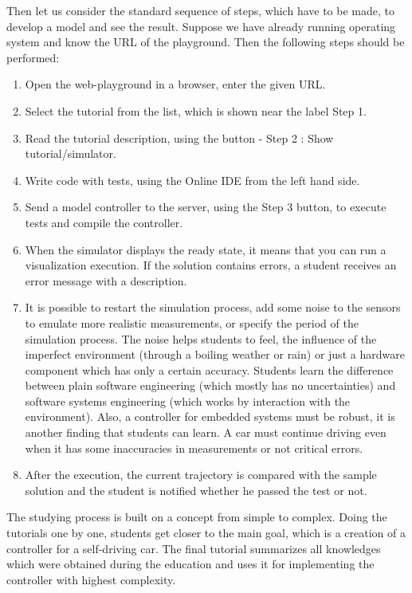 Then let us consider the standard sequence of steps, which have to be made, to develop a model and see the result. Suppose we have already running operating system and know the URL \cite{OnlineExample} of the playground. Then the following steps should be performed:
\begin{enumerate}
    \item Open the web-playground in a browser, enter the given URL.
    \item Select the tutorial from the list, which is shown near the label Step 1.
    \item Read the tutorial description, using the button - Step 2 : Show tutorial/simulator.
    \item Write code with tests, using the Online IDE from the left hand side.
    \item Send a model controller to the server, using the Step 3 button, to execute tests and compile the controller.
    \item When the simulator displays the ready state, it means that you can run a visualization execution. If the solution contains errors, a student receives an error message with a description.
    \item It is possible to restart the simulation process, add some noise to the sensors to emulate more realistic measurements, or specify the period of the simulation process. The noise helps students to feel, the influence of the imperfect environment (through a boiling weather or rain) or just a hardware component which has only a certain accuracy. Students learn the difference between plain software engineering (which mostly has no uncertainties) and software systems engineering (which works by interaction with the environment). Also, a controller for embedded systems must be robust, it is another finding that students can learn. A car must continue driving even when it has some inaccuracies in measurements or not critical errors.
    \item After the execution, the current trajectory is compared with the sample solution and the student is notified whether he passed the test or not.
\end{enumerate}
The studying process is built on a concept from simple to complex. Doing the tutorials one by one, students get closer to the main goal, which is a creation of a controller for a self-driving car. The final tutorial summarizes all knowledges which were obtained during the education and uses it for implementing the controller with highest complexity.

